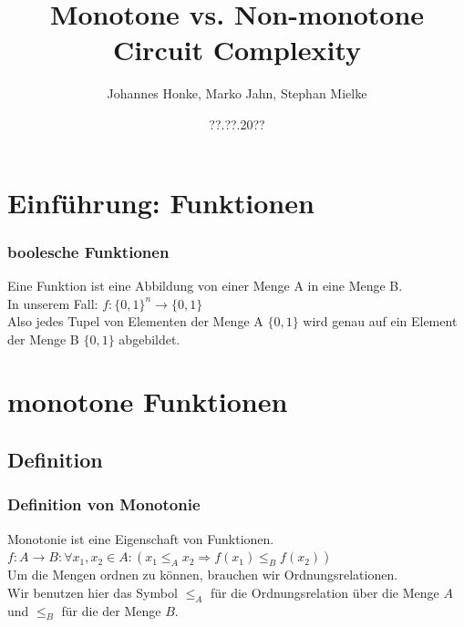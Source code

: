 \documentclass[hyperref={pdfpagelabels=false}]{beamer} %
\title{Monotone vs. Non-monotone Circuit Complexity}
\author{Johannes Honke, Marko Jahn, Stephan Mielke}
\institute{BTU-Cottbus}
\date{??.??.20??}
\begin{document}
  \begin{frame}[plain]
    \titlepage
    \tableofcontents
  \end{frame}

  \section{Einführung: Funktionen}
  \begin{frame} %
    \frametitle{boolesche Funktionen}
    Eine Funktion ist eine Abbildung von einer Menge A in eine Menge B.\\
    In unserem Fall: $f: \{0,1\}^{n} \rightarrow \{0,1\}$ \\
    Also jedes Tupel von Elementen der Menge A $\{0, 1\}$ wird genau auf ein Element der Menge B $\{0, 1\}$ abgebildet.
  \end{frame}

  \section{monotone Funktionen}
  \subsection*{Definition}
  \begin{frame}%
    \frametitle{Definition von Monotonie}
    Monotonie ist eine Eigenschaft von Funktionen.\\
    $f:A \rightarrow B: \forall x_1,x_2 \in A : (x_1 \leq_A x_2 \Rightarrow f(x_1) \leq_B f(x_2))$\\
    Um die Mengen ordnen zu können, brauchen wir Ordnungsrelationen.\\
    Wir benutzen hier das Symbol $\leq_A$ für die Ordnungsrelation über die Menge $A$ und $\leq_B$ für die der Menge $B$.
  \end{frame}
\end{document}
